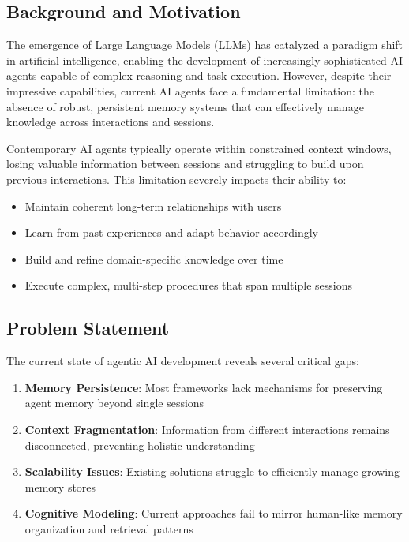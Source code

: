 \documentclass[journal]{IEEEtran}
\begin{document}
\subsection{Background and Motivation}

The emergence of Large Language Models (LLMs) has catalyzed a paradigm shift in artificial intelligence, enabling the development of increasingly sophisticated AI agents capable of complex reasoning and task execution. However, despite their impressive capabilities, current AI agents face a fundamental limitation: the absence of robust, persistent memory systems that can effectively manage knowledge across interactions and sessions.

Contemporary AI agents typically operate within constrained context windows, losing valuable information between sessions and struggling to build upon previous interactions. This limitation severely impacts their ability to:
\begin{itemize}
\item Maintain coherent long-term relationships with users
\item Learn from past experiences and adapt behavior accordingly
\item Build and refine domain-specific knowledge over time
\item Execute complex, multi-step procedures that span multiple sessions
\end{itemize}

\subsection{Problem Statement}

The current state of agentic AI development reveals several critical gaps:

\begin{enumerate}
\item \textbf{Memory Persistence}: Most frameworks lack mechanisms for preserving agent memory beyond single sessions
\item \textbf{Context Fragmentation}: Information from different interactions remains disconnected, preventing holistic understanding
\item \textbf{Scalability Issues}: Existing solutions struggle to efficiently manage growing memory stores
\item \textbf{Cognitive Modeling}: Current approaches fail to mirror human-like memory organization and retrieval patterns
\end{enumerate}
\end{document}
